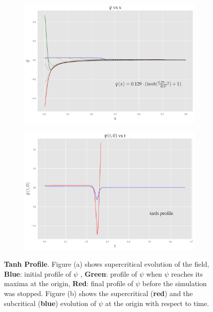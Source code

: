 \begin{figure}
    \centering
    \begin{subfigure}[b]{0.85\textwidth}
        \includegraphics[width=1\linewidth]{images/super_tanh.pdf}
        \caption{}
        \label{fig:tanh}
    \end{subfigure}

    \begin{subfigure}[b]{0.85\textwidth}
        \includegraphics[width=1\linewidth]{images/at0_tanh.pdf}
        \caption{}
        \label{fig:at0_tanh}
    \end{subfigure}
    \caption[tanh profile field evolution]{\textbf{Tanh Profile}. Figure (a) shows supercritical evolution of the field, \textbf{Blue}: initial profile of $\psi$ , \textbf{Green}: profile of $\psi$ when $\psi$ reaches its maxima at the origin, \textbf{Red}: final profile of $\psi$ before the simulation was stopped. Figure (b) shows the supercritical (\textbf{red}) and the subcritical (\textbf{blue}) evolution of $\psi$ at the origin with respect to time.}
\end{figure}

